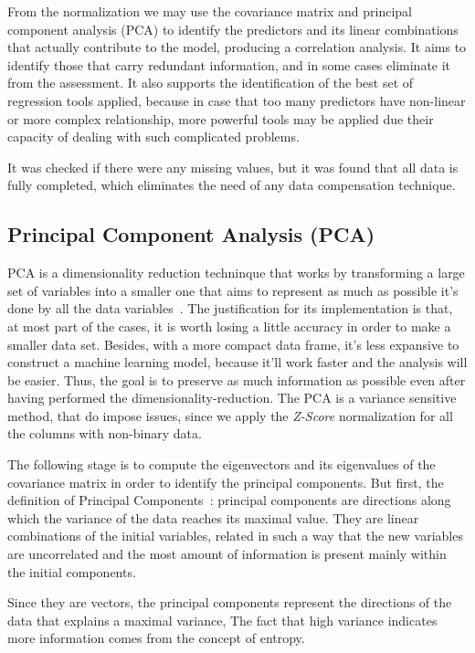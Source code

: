 From the normalization we may use the covariance matrix and principal component analysis (PCA) to identify the predictors and its linear combinations that actually contribute to the model, producing a correlation analysis. It aims to identify those that carry redundant information, and in some cases eliminate it from the assessment. It also supports the identification of the best set of regression tools applied, because in case that too many predictors have non-linear or more complex relationship, more powerful tools may be applied due their capacity of dealing with such complicated problems. 

It was checked if there were any missing values, but it was found that all data is fully completed, which eliminates the need of any data compensation technique. 

\subsection{Principal Component Analysis (PCA)}
PCA is a dimensionality reduction techninque that works by transforming a large set of variables into a smaller one that aims to represent as much as possible it's done by all the data variables~\cite{Abdi2010}. The justification for its implementation is that, at most part of the cases, it is worth losing a little accuracy in order to make a smaller data set. Besides, with a more compact data frame, it's less expansive to construct a machine learning model, because it'll work faster and the analysis will be easier. Thus, the goal is to preserve as much information as possible even after having performed the dimensionality-reduction. The PCA is a variance sensitive method, that do impose issues, since we apply the \textit{Z-Score} normalization for all the columns with non-binary data.

The following stage is to compute the eigenvectors and its eigenvalues of the covariance matrix in order to identify the principal components. But first, the definition of Principal Components~\cite{Ringner2001}: principal components are directions along which the variance of the data reaches its maximal value. They are linear combinations of the initial variables, related in such a way that the new variables are uncorrelated and the most amount of information is present mainly within the initial components.

Since they are vectors, the principal components represent the directions of the data that explains a maximal variance, The fact that high variance indicates more information comes from the concept of entropy. 

